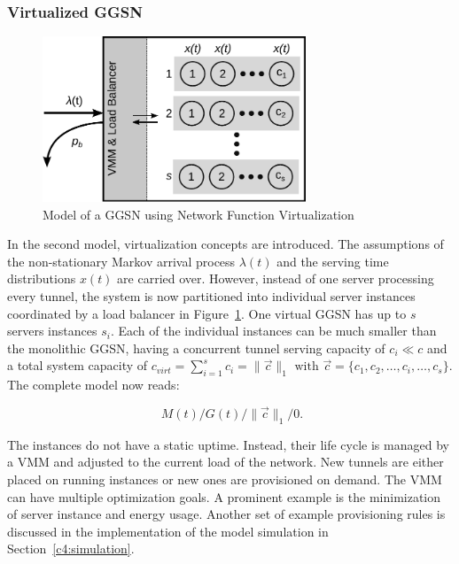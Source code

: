 \subsubsection{Virtualized \texorpdfstring{\acrshort{GGSN}}{GGSN}}
\label{c4:sec:virtual_ggsn}

\begin{figure}[htb]
	\centering
	\includegraphics[width=0.7\textwidth]{images/ggsn-virtualized.pdf}
	\caption{Model of a GGSN using Network Function Virtualization}
\label{c4:fig:model-ggsn-virtualized}
\end{figure}

In the second model, virtualization concepts are introduced. The assumptions of the non-stationary Markov arrival process $\lambda(t)$ and the serving time distributions $x(t)$ are carried over. However, instead of one server processing every tunnel, the system is now partitioned into individual server instances coordinated by a load balancer in Figure~\ref{c4:fig:model-ggsn-virtualized}. One virtual \gls{GGSN} has up to $s$ servers instances $s_i$. Each of the individual instances can be much smaller than the monolithic \gls{GGSN}, having a concurrent tunnel serving capacity of $c_i \ll c$ and a total system capacity of $c_{virt} = \sum_{i=1}^{s} c_i = \| \overrightarrow{c}\|_1 \text{ with } \overrightarrow{c} = \{c_1, c_2, \ldots ,c_i, \ldots ,c_s\}$. %
The complete model now reads:

\begin{equation}
\phantom{.}M(t)/G(t)/\|\overrightarrow{c}\|_1/0\text{.}
\end{equation}

The instances do not have a static uptime. Instead, their life cycle is managed by a \gls{VMM} and adjusted to the current load of the network. New tunnels are either placed on running instances or new ones are provisioned on demand. The \gls{VMM} can have multiple optimization goals. A prominent example is the minimization of server instance and energy usage.  Another set of example provisioning rules is discussed in the implementation of the model simulation in Section~\ref{c4:simulation}. 

